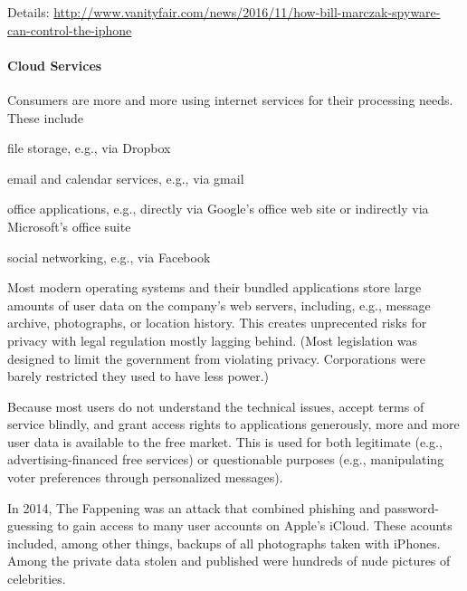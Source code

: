 Details: \url{http://www.vanityfair.com/news/2016/11/how-bill-marczak-spyware-can-control-the-iphone}

\paragraph{Cloud Services}
Consumers are more and more using internet services for their processing needs.
These include
\begin{compactitem}
\item file storage, e.g., via Dropbox
\item email and calendar services, e.g., via gmail
\item office applications, e.g., directly via Google's office web site or indirectly via Microsoft's office suite
\item social networking, e.g., via Facebook
\end{compactitem}
Most modern operating systems and their bundled applications store large amounts of user data on the company's web servers, including, e.g., message archive, photographs, or location history.
This creates unprecented risks for privacy with legal regulation mostly lagging behind.
(Most legislation was designed to limit the government from violating privacy.
Corporations were barely restricted they used to have less power.)

Because most users do not understand the technical issues, accept terms of service blindly, and grant access rights to applications generously, more and more user data is available to the free market.
This is used for both legitimate (e.g., advertising-financed free services) or questionable purposes (e.g., manipulating voter preferences through personalized messages).

In 2014, The Fappening was an attack that combined phishing and password-guessing to gain access to many user accounts on Apple's iCloud.
These acounts included, among other things, backups of all photographs taken with iPhones.
Among the private data stolen and published were hundreds of nude pictures of celebrities.

